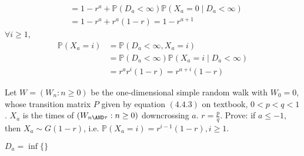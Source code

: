 \documentclass{ctexart}
\begin{document}
\begin{solution}
\begin{enumerate}
\[\begin{aligned}
      &=1-r^a + \mathbb{P}(D_a < \infty)\mathbb{P}(X_a=0 \mid D_a < \infty)\\ 
      &=1-r^a + r^a(1-r)=1-r^{a + 1}
    \end{aligned}
    \]
    \(\forall i \geq 1\),
\[
  \begin{aligned}
    \mathbb{P}(X_a=i)&=\mathbb{P}(D_a< \infty,X_a=i)\\ 
                     &=    \mathbb{P}(D_a< \infty)\mathbb{P}(X_a = i \mid D_a < \infty)\\ 
                     &=r^ar^i(1-r)=r^{a + i}(1-r)
  \end{aligned}
\]
\end{enumerate}
\end{solution}
\begin{problem}\label{pro:4}
  Let \(W=(W_n:n \geq 0)\) be the one-dimensional simple random walk with \(W_0=0\), whose transition matrix \(P\) given by equation \((4.4.3)\)
  on textbook, \(0< p<q<1\).
  \(X_a\) is the times of \((W_{n \AND \tau}:n \geq 0)\) downcrossing \(a\).
  \(r=\frac{p}{q}\).
  Prove: if \(a \leq -1\), then \(X_a \sim G(1-r)\), i.e. \(\mathbb{P}(X_a=i)=r^{i-1}(1-r),i \geq 1\).
\end{problem}
\begin{solution}
  \(D_a= \inf \{\}\)
\end{solution}
\end{document}
